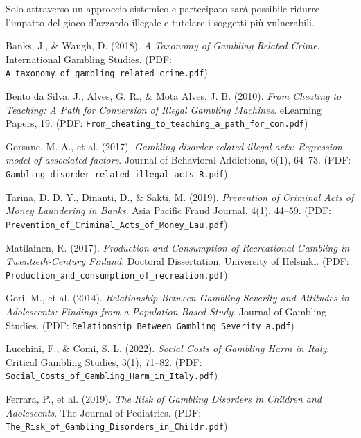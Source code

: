 \documentclass[a4paper,12pt]{article}
\begin{document}
Solo attraverso un approccio sistemico e partecipato sarà possibile ridurre l’impatto del gioco d’azzardo illegale e tutelare i soggetti più vulnerabili.


\begin{thebibliography}{99}

Banks, J., \& Waugh, D. (2018). \textit{A Taxonomy of Gambling Related Crime}. International Gambling Studies. 
(PDF: \texttt{A\_taxonomy\_of\_gambling\_related\_crime.pdf})

Bento da Silva, J., Alves, G. R., \& Mota Alves, J. B. (2010). \textit{From Cheating to Teaching: A Path for Conversion of Illegal Gambling Machines}. eLearning Papers, 19.
(PDF: \texttt{From\_cheating\_to\_teaching\_a\_path\_for\_con.pdf})

Gorsane, M. A., et al. (2017). \textit{Gambling disorder-related illegal acts: Regression model of associated factors}. Journal of Behavioral Addictions, 6(1), 64–73.
(PDF: \texttt{Gambling\_disorder\_related\_illegal\_acts\_R.pdf})

Tarina, D. D. Y., Dinanti, D., \& Sakti, M. (2019). \textit{Prevention of Criminal Acts of Money Laundering in Banks}. Asia Pacific Fraud Journal, 4(1), 44–59.
(PDF: \texttt{Prevention\_of\_Criminal\_Acts\_of\_Money\_Lau.pdf})

Matilainen, R. (2017). \textit{Production and Consumption of Recreational Gambling in Twentieth-Century Finland}. Doctoral Dissertation, University of Helsinki.
(PDF: \texttt{Production\_and\_consumption\_of\_recreation.pdf})

Gori, M., et al. (2014). \textit{Relationship Between Gambling Severity and Attitudes in Adolescents: Findings from a Population-Based Study}. Journal of Gambling Studies.
(PDF: \texttt{Relationship\_Between\_Gambling\_Severity\_a.pdf})

Lucchini, F., \& Comi, S. L. (2022). \textit{Social Costs of Gambling Harm in Italy}. Critical Gambling Studies, 3(1), 71–82. 
(PDF: \texttt{Social\_Costs\_of\_Gambling\_Harm\_in\_Italy.pdf})

Ferrara, P., et al. (2019). \textit{The Risk of Gambling Disorders in Children and Adolescents}. The Journal of Pediatrics.
(PDF: \texttt{The\_Risk\_of\_Gambling\_Disorders\_in\_Childr.pdf})

\end{thebibliography}
\end{document}
